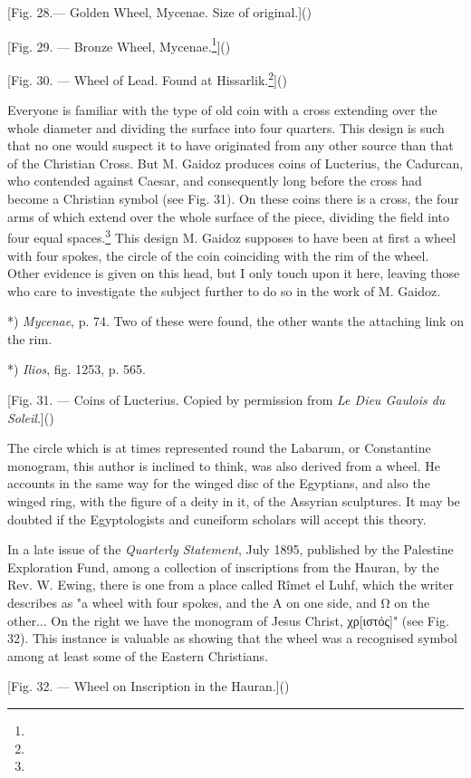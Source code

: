 \documentclass[a4paper, 11pt, oneside, polutonikogreek, english]{article}
\begin{document}
[Fig. 28.--- Golden Wheel, Mycenae. Size of original.]()

[Fig. 29. --- Bronze Wheel, Mycenae.\footnote{}]()

[Fig. 30. --- Wheel of Lead. Found at Hissarlik.\footnote{}]()

Everyone is familiar with the type of old coin with a cross extending over the whole diameter and dividing the surface into four quarters. This design is such that no one would suspect it to have originated from any other source than that of the Christian Cross. But M. Gaidoz produces coins of Lucterius, the Cadurcan, who contended against Caesar, and consequently long before the cross had become a Christian symbol (see Fig. 31). On these coins there is a cross, the four arms of which extend over the whole surface of the piece, dividing the field into four equal spaces.\footnote{} This design M. Gaidoz supposes to have been at first a wheel with four spokes, the circle of the coin coinciding with the rim of the wheel. Other evidence is given on this head, but I only touch upon it here, leaving those who care to investigate the subject further to do so in the work of M. Gaidoz.

*) \emph{Mycenae}, p. 74. Two of these were found, the other wants the attaching link on the rim.

*) \emph{Ilios}, fig. 1253, p. 565.

[Fig. 31. --- Coins of Lucterius. Copied by permission from \emph{Le Dieu Gaulois du Soleil}.]()

The circle which is at times represented round the Labarum, or Constantine monogram, this author is inclined to think, was also derived from a wheel. He accounts in the same way for the winged disc of the Egyptians, and also the winged ring, with the figure of a deity in it, of the Assyrian sculptures. It may be doubted if the Egyptologists and cuneiform scholars will accept this theory.

In a late issue of the \emph{Quarterly Statement}, July 1895, published by the Palestine Exploration Fund, among a collection of inscriptions from the Hauran, by the Rev. W. Ewing, there is one from a place called Rîmet el Luhf, which the writer describes as "a wheel with four spokes, and the Α on one side, and Ω on the other... On the right we have the monogram of Jesus Christ, χρ[ιστός]" (see Fig. 32). This instance is valuable as showing that the wheel was a recognised symbol among at least some of the Eastern Christians.

[Fig. 32. --- Wheel on Inscription in the Hauran.]()
\end{document}
